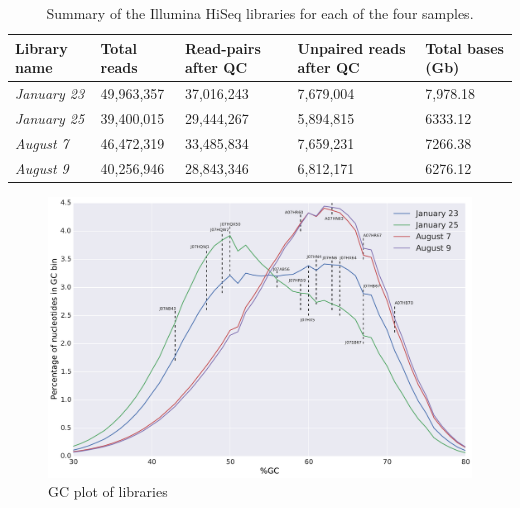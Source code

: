 \begin{table}[hbt]
  \caption{Summary of the Illumina HiSeq libraries for each of the four samples.}
  \begin{tabularx}{\textwidth}{L{2.2cm}R{2cm}R{3cm}R{3.2cm}R{2cm}}
  \hline
    \textbf{Library name} & \textbf{Total reads} & \textbf{Read-pairs after QC} & \textbf{Unpaired reads after QC} & \textbf{Total bases (Gb)} \\
    \hline 
    \textit{January 23} & 49,963,357 & 37,016,243 & 7,679,004 & 7,978.18\\
    \textit{January 25} & 39,400,015 & 29,444,267 & 5,894,815 & 6333.12 \\
    \textit{August 7} & 46,472,319 & 33,485,834 & 7,659,231 & 7266.38 \\
    \textit{August 9} & 40,256,946 & 28,843,346 & 6,812,171 & 6276.12 \\
  \end{tabularx}
  \label{LibSequenceQC}
\end{table}

\begin{figure}[!hbtp]
  \centering
  \includegraphics[width=\textwidth]{Chapter5/Figures/GC_content_HiSeqLibs.pdf}
  \caption{GC plot of libraries}
  \label{ReadsGCplot}
\end{figure}

\thispagestyle{facingcaption}
\begin{table}[h]
\captionsetup{labelformat=prev-page}
\caption{\textbf{Table \ref{LT_chemical}:} Physical and chemical composition of the Lake Tyrrell water samples. Concentrations are given in units of \si{\milli\mole\per\liter}}
\label{LT_chemical}
\end{table}
\clearpage

